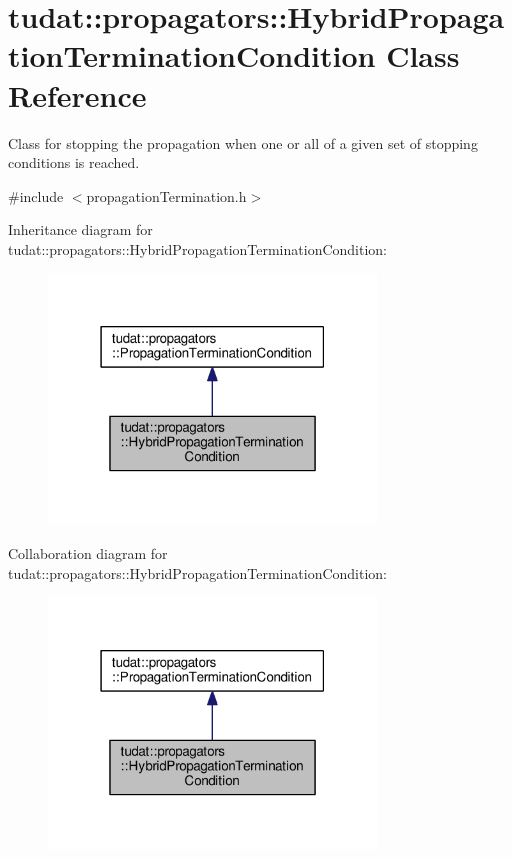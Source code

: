 \hypertarget{classtudat_1_1propagators_1_1HybridPropagationTerminationCondition}{}\section{tudat\+:\+:propagators\+:\+:Hybrid\+Propagation\+Termination\+Condition Class Reference}
\label{classtudat_1_1propagators_1_1HybridPropagationTerminationCondition}


Class for stopping the propagation when one or all of a given set of stopping conditions is reached.  




{\ttfamily \#include $<$propagation\+Termination.\+h$>$}



Inheritance diagram for tudat\+:\+:propagators\+:\+:Hybrid\+Propagation\+Termination\+Condition\+:
\nopagebreak
\begin{figure}[H]
\begin{center}
\leavevmode
\includegraphics[width=247pt]{classtudat_1_1propagators_1_1HybridPropagationTerminationCondition__inherit__graph}
\end{center}
\end{figure}


Collaboration diagram for tudat\+:\+:propagators\+:\+:Hybrid\+Propagation\+Termination\+Condition\+:
\nopagebreak
\begin{figure}[H]
\begin{center}
\leavevmode
\includegraphics[width=247pt]{classtudat_1_1propagators_1_1HybridPropagationTerminationCondition__coll__graph}
\end{center}
\end{figure}
